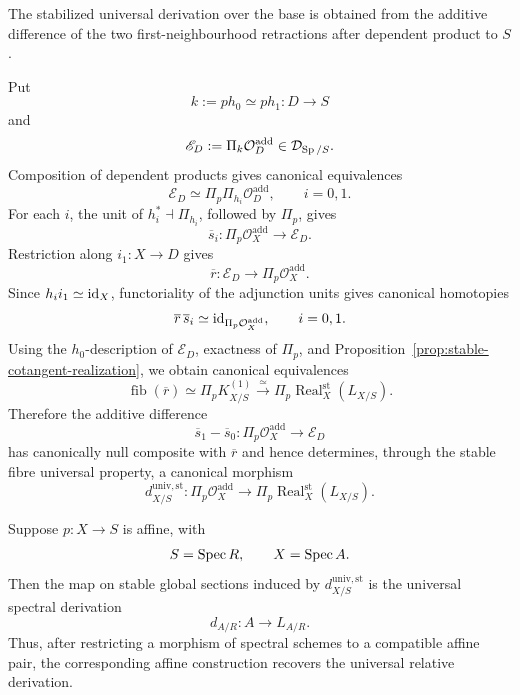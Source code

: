 \begin{construction}
\label{con:stabilized-universal-derivation}
The stabilized universal derivation over the base is obtained from the additive
difference of the two first-neighbourhood retractions after dependent product to
\(S\).

Put
\[
  k:=ph_0\simeq ph_1:D\longrightarrow S
\]
and
\[
  \mathscr E_D
  :=
  \Pi_k\mathcal O_D^{\mathrm{add}}
  \in\mathcal D_{\operatorname{Sp}/S}.
\]
Composition of dependent products gives canonical equivalences
\[
  \mathscr E_D
  \simeq
  \Pi_p\Pi_{h_i}\mathcal O_D^{\mathrm{add}},
  \qquad i=0,1.
\]
For each \(i\), the unit of \(h_i^*\dashv\Pi_{h_i}\), followed by \(\Pi_p\),
gives
\[
  \overline s_i:
  \Pi_p\mathcal O_X^{\mathrm{add}}
  \longrightarrow
  \mathscr E_D.
\]
Restriction along \(i_1:X\to D\) gives
\[
  \overline r:
  \mathscr E_D
  \longrightarrow
  \Pi_p\mathcal O_X^{\mathrm{add}}.
\]
Since \(h_ii_1\simeq\operatorname{id}_X\), functoriality of the adjunction units gives canonical
homotopies
\[
  \overline r\,\overline s_i
  \simeq
  \operatorname{id}_{\Pi_p\mathcal O_X^{\mathrm{add}}},
  \qquad i=0,1.
\]
Using the \(h_0\)-description of \(\mathscr E_D\), exactness of \(\Pi_p\), and
Proposition~\ref{prop:stable-cotangent-realization}, we obtain canonical
equivalences
\[
  \operatorname{fib}(\overline r)
  \simeq
  \Pi_pK^{(1)}_{X/S}
  \xrightarrow{\simeq}
  \Pi_p\operatorname{Real}^{\mathrm{st}}_X(L_{X/S}).
\]
Therefore the additive difference
\[
  \overline s_1-\overline s_0:
  \Pi_p\mathcal O_X^{\mathrm{add}}
  \longrightarrow
  \mathscr E_D
\]
has canonically null composite with \(\overline r\) and hence determines, through
the stable fibre universal property, a canonical morphism
\[
  d^{\mathrm{univ,st}}_{X/S}:
  \Pi_p\mathcal O_X^{\mathrm{add}}
  \longrightarrow
  \Pi_p\operatorname{Real}^{\mathrm{st}}_X(L_{X/S}).
\]

\end{construction}

\begin{proposition}
\label{prop:stabilized-derivation-affine}
Suppose \(p:X\to S\) is affine, with
\[
  S=\operatorname{Spec} R,
  \qquad
  X=\operatorname{Spec} A.
\]
Then the map on stable global sections induced by
\(d^{\mathrm{univ,st}}_{X/S}\) is the universal spectral derivation
\[
  d_{A/R}:A\longrightarrow L_{A/R}.
\]
Thus, after restricting a morphism of spectral schemes to a compatible affine pair, the
corresponding affine construction recovers the universal relative derivation.
\end{proposition}

